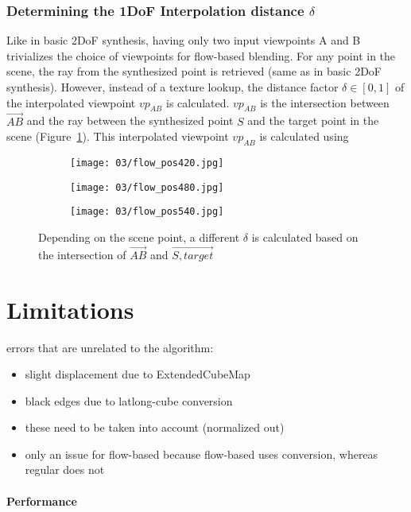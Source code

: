 
\subsubsection{Determining the 1DoF Interpolation distance $\delta$} \label{subsec:flow-based-blending}
Like in basic 2DoF synthesis, having only two input viewpoints A and B trivializes the choice of viewpoints for flow-based blending. For any point in the scene, the ray from the synthesized point is retrieved (same as in basic 2DoF synthesis). However, instead of a texture lookup, the distance factor $\delta \in [0,1]$ of the interpolated viewpoint $vp_{AB}$ is calculated. $vp_{AB}$ is the intersection between $\overrightarrow{AB}$ and the ray between the synthesized point $S$ and the target point in the scene (Figure~\ref{fig:flow_pos}). This interpolated viewpoint $vp_{AB}$ is calculated using 

\begin{figure}
\centering
    \hfill
    \begin{subfigure}[t]{0.33\textwidth}            
            \centering
            \texttt{[image: 03/flow\_pos420.jpg]}
            \caption{}
    \end{subfigure}%
    \hfill
    \begin{subfigure}[t]{0.33\textwidth}
            \centering
            \texttt{[image: 03/flow\_pos480.jpg]}
            \caption{}
    \end{subfigure}
    \hfill
    \begin{subfigure}[t]{0.33\textwidth}
            \centering
            \texttt{[image: 03/flow\_pos540.jpg]}
            \caption{}
    \end{subfigure}
    \hfill
    \caption[Different examples of $\delta$]{Depending on the scene point, a different $\delta$ is calculated based on the intersection of $\overrightarrow{AB}$ and $\overrightarrow{S,target}$} \label{fig:flow_pos}
\end{figure}

\section{Limitations}
errors that are unrelated to the algorithm:
\begin{itemize}
  \item slight displacement due to ExtendedCubeMap
  \item black edges due to latlong-cube conversion
  \item these need to be taken into account (normalized out)
  \item only an issue for flow-based because flow-based uses conversion, whereas regular does not
\end{itemize}

\paragraph{Performance}

